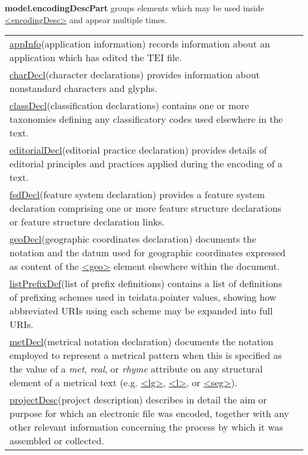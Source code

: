 \begin{sansreflist}
\item [\textbf{model.encodingDescPart}] groups elements which may be used inside \hyperref[TEI.encodingDesc]{<encodingDesc>} and appear multiple times. \par 
\begin{longtable}{P{0.1777151799687011\textwidth}P{0.6722848200312989\textwidth}}
\hyperref[TEI.appInfo]{appInfo}\tabcellsep (application information) records information about an application which has edited the TEI file.\\
\hyperref[TEI.charDecl]{charDecl}\tabcellsep (character declarations) provides information about nonstandard characters and glyphs.\\
\hyperref[TEI.classDecl]{classDecl}\tabcellsep (classification declarations) contains one or more taxonomies defining any classificatory codes used elsewhere in the text.\\
\hyperref[TEI.editorialDecl]{editorialDecl}\tabcellsep (editorial practice declaration) provides details of editorial principles and practices applied during the encoding of a text.\\
\hyperref[TEI.fsdDecl]{fsdDecl}\tabcellsep (feature system declaration) provides a feature system declaration comprising one or more feature structure declarations or feature structure declaration links.\\
\hyperref[TEI.geoDecl]{geoDecl}\tabcellsep (geographic coordinates declaration) documents the notation and the datum used for geographic coordinates expressed as content of the \hyperref[TEI.geo]{<geo>} element elsewhere within the document.\\
\hyperref[TEI.listPrefixDef]{listPrefixDef}\tabcellsep (list of prefix definitions) contains a list of definitions of prefixing schemes used in \textsf{teidata.pointer} values, showing how abbreviated URIs using each scheme may be expanded into full URIs.\\
\hyperref[TEI.metDecl]{metDecl}\tabcellsep (metrical notation declaration) documents the notation employed to represent a metrical pattern when this is specified as the value of a {\itshape met}, {\itshape real}, or {\itshape rhyme} attribute on any structural element of a metrical text (e.g. \hyperref[TEI.lg]{<lg>}, \hyperref[TEI.l]{<l>}, or \hyperref[TEI.seg]{<seg>}).\\
\hyperref[TEI.projectDesc]{projectDesc}\tabcellsep (project description) describes in detail the aim or purpose for which an electronic file was encoded, together with any other relevant information concerning the process by which it was assembled or collected.\\

\end{longtable}
\end{sansreflist}
